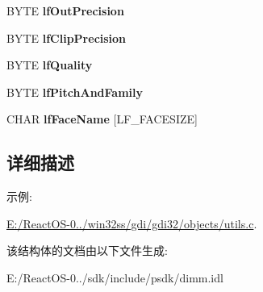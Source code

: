 \begin{DoxyCompactItemize}
\mbox{\label{struct_l_o_g_f_o_n_t_a_a86a3b8654573e768b18a72feaf455b4d}} 
B\+Y\+TE {\bfseries lf\+Out\+Precision}
\item 
\mbox{\label{struct_l_o_g_f_o_n_t_a_a7a92c246ba98c0519d9b1929d88a7088}} 
B\+Y\+TE {\bfseries lf\+Clip\+Precision}
\item 
\mbox{\label{struct_l_o_g_f_o_n_t_a_a7fa5529a430119cedbac626996a7d74a}} 
B\+Y\+TE {\bfseries lf\+Quality}
\item 
\mbox{\label{struct_l_o_g_f_o_n_t_a_ab8274e88d55ce85154016f9791d9ea52}} 
B\+Y\+TE {\bfseries lf\+Pitch\+And\+Family}
\item 
\mbox{\label{struct_l_o_g_f_o_n_t_a_ae9b6cf72c5ab3e2223c9276b7044aa92}} 
C\+H\+AR {\bfseries lf\+Face\+Name} \mbox{[}L\+F\+\_\+\+F\+A\+C\+E\+S\+I\+ZE\mbox{]}
\end{DoxyCompactItemize}


\subsection{详细描述}
\begin{Desc}
\item[示例\+: ]\par
\hyperlink{_e_1_2_react_o_s-0_84_86_2win32ss_2gdi_2gdi32_2objects_2utils_8c-example}{E\+:/\+React\+O\+S-\/0../win32ss/gdi/gdi32/objects/utils.\+c}.\end{Desc}


该结构体的文档由以下文件生成\+:\begin{DoxyCompactItemize}
\item 
E\+:/\+React\+O\+S-\/0../sdk/include/psdk/dimm.\+idl\end{DoxyCompactItemize}
